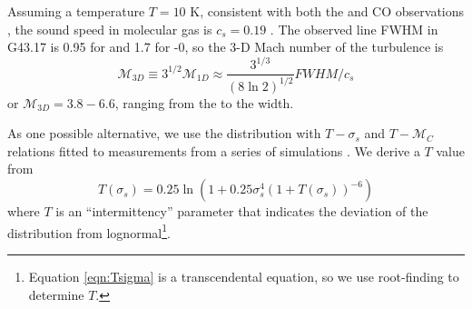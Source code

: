 Assuming a temperature $T=10$ K, consistent with both the \formaldehyde and CO
observations \citep{Plume2004a}, the sound speed in molecular gas is $c_s=0.19$
\kms.  The observed line FWHM in G43.17 is 0.95 \kms for \formaldehyde and 1.7 \kms for
-0,
so the 3-D Mach number of the turbulence is
$$\mathcal{M}_{3D} \equiv 3^{1/2} \mathcal{M}_{1D} \approx \frac{3^{1/3}}{(8\ln 2)^{1/2}} FWHM / c_s $$
or $\mathcal{M}_{3D} = 3.8 - 6.6 $, ranging from the \formaldehyde to the \thirteenco width.



As one possible alternative, we use the
\citet{Hopkins2013a} distribution with $T-\sigma_s$ and $T-\mathcal{M}_C$
relations fitted to measurements from a series of simulations
\citep{Kowal2007a,Kritsuk2007a,Schmidt2009a,Federrath2010a,Federrath2012a,Konstandin2012a,Molina2012a}.
We derive a $T$ value from 
\begin{equation} 
    \label{eqn:Tsigma}
    T(\sigma_s) = 0.25 \ln (1+0.25 \sigma_s^4 \left(1+T(\sigma_s)\right)^{-6})
\end{equation}
where $T$ is an ``intermittency'' parameter that indicates the
deviation of the distribution from lognormal\footnote{Equation \ref{eqn:Tsigma}
is a transcendental equation, so we use root-finding to determine $T$.}.  

